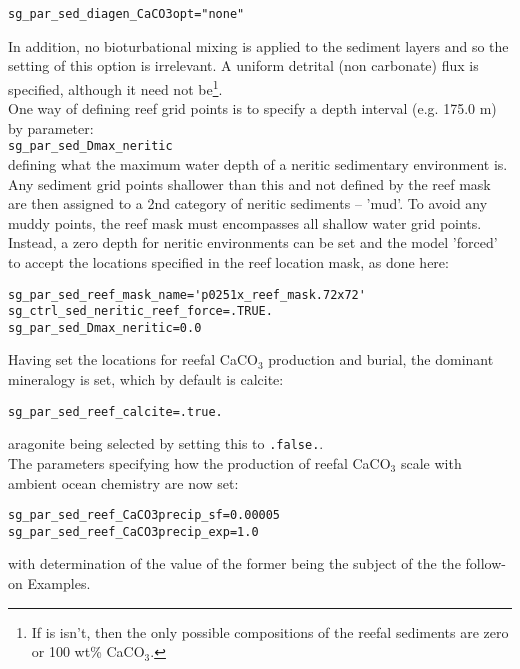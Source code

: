 \documentclass[10pt,twoside]{article}
\begin{document}
\begin{compactitem}
\begin{verbatim}
sg_par_sed_diagen_CaCO3opt="none"
                \end{verbatim}\vspace{-5pt}
                In addition, no bioturbational mixing is applied to the sediment layers and so the setting of this option is irrelevant. A uniform detrital (non carbonate) flux is specified, although it need not be\footnote{If is isn't, then the only possible compositions of the reefal sediments are zero or 100 wt\% CaCO$_{3}$.}.
\\ One way of defining reef grid points is to specify a depth interval (e.g. 175.0 m) by parameter:
\\\texttt{sg\_par\_sed\_Dmax\_neritic}
\\defining what the maximum water depth of a neritic sedimentary environment is. Any sediment grid points shallower than this and not defined by the reef mask are then assigned to a 2nd category of neritic sediments -- 'mud'. To avoid any muddy points, the reef mask must encompasses all shallow water grid points.
                Instead, a zero depth for neritic environments can be set and the model 'forced' to accept the locations specified in the reef location mask, as done here:
\vspace{-5pt}\begin{verbatim}
sg_par_sed_reef_mask_name='p0251x_reef_mask.72x72'
sg_ctrl_sed_neritic_reef_force=.TRUE.
sg_par_sed_Dmax_neritic=0.0
                \end{verbatim}\vspace{-5pt}
Having set the locations for reefal CaCO$_{3}$ production and burial, the dominant mineralogy is set, which by default is calcite:
\vspace{-5pt}\begin{verbatim}
sg_par_sed_reef_calcite=.true.
                \end{verbatim}\vspace{-5pt}
                aragonite being selected by setting this to \texttt{.false.}.
                \\ The parameters specifying how the production of reefal CaCO$_{3}$ scale with ambient ocean chemistry are now set:
\vspace{-5pt}\begin{verbatim}
sg_par_sed_reef_CaCO3precip_sf=0.00005
sg_par_sed_reef_CaCO3precip_exp=1.0
                \end{verbatim}\vspace{-5pt}
                with determination of the value of the former being the subject of the the follow-on Examples.

\end{compactitem}
\end{document}
